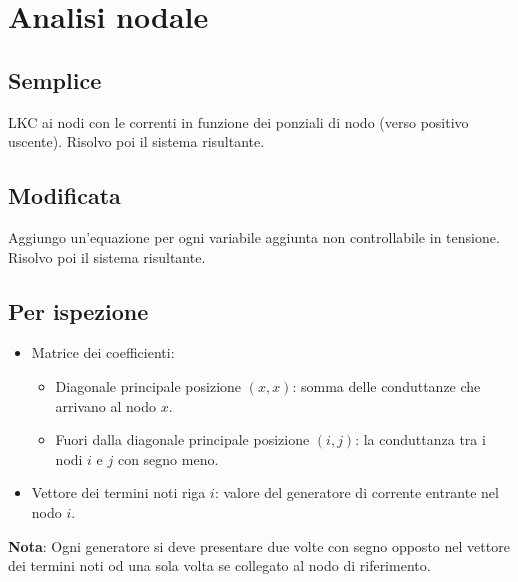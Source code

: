 \documentclass{article}
\begin{document}
    \newpage

    \section*{Analisi nodale}

        \begin{multicols}{2}
            
            \subsection*{Semplice}
            
                LKC ai nodi con le correnti in funzione dei ponziali di nodo (verso positivo uscente).
                Risolvo poi il sistema risultante.

            \subsection*{Modificata}

                Aggiungo un'equazione per ogni variabile aggiunta non controllabile in tensione.
                Risolvo poi il sistema risultante.

            \vfill\null
            \columnbreak

            \subsection*{Per ispezione}

                \begin{itemize}
                    \item Matrice dei coefficienti:
                        \begin{itemize}
                            \item Diagonale principale posizione \((x,x)\): somma delle conduttanze che arrivano al nodo \(x\).
                            \item Fuori dalla diagonale principale posizione \((i,j)\): la conduttanza tra i nodi \(i\) e \(j\) con segno meno.
                        \end{itemize}
                    \item Vettore dei termini noti riga \(i\): valore del generatore di corrente entrante nel nodo \(i\).
                \end{itemize}

        \end{multicols}

        \textbf{Nota}: Ogni generatore si deve presentare due volte con segno opposto nel vettore dei termini noti od una sola volta
        se collegato al nodo di riferimento.
\end{document}
